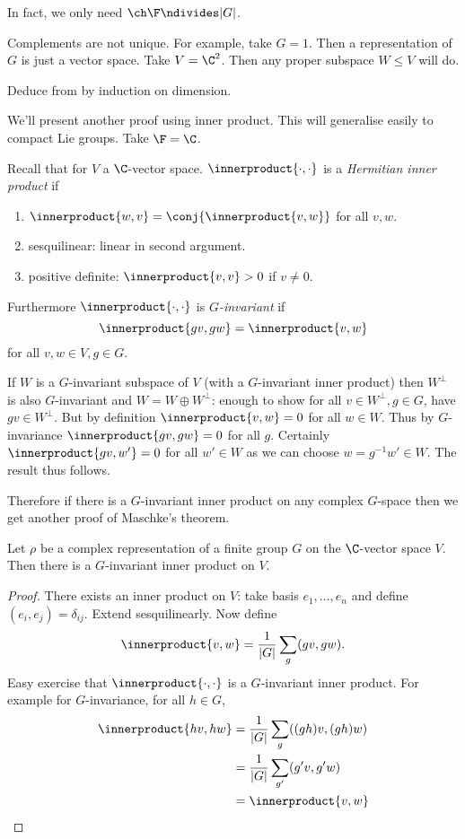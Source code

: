 \documentclass[a4paper]{article}
\newcommand*{\ip}{\innerproduct} %
\theoremstyle{definition}
\begin{document}
In fact, we only need \(\ch \F \ndivides |G|\).

\begin{remark}
  Complements are not unique. For example, take \(G = 1\). Then a representation of \(G\) is just a vector space. Take \(V = \C^2\). Then any proper subspace \(W \leq V\) will do.
\end{remark}

\begin{ex}
  Deduce  from  by induction on dimension.
\end{ex}

We'll present another proof using inner product. This will generalise easily to compact Lie groups. Take \(\F = \C\).

Recall that for \(V\) a \(\C\)-vector space. \(\ip{\cdot, \cdot}\) is a \emph{Hermitian inner product} if
\begin{enumerate}
\item \(\ip{w, v} = \conj{\ip{v, w}}\) for all \(v, w\).
\item sesquilinear: linear in second argument.
\item positive definite: \(\ip{v, v} > 0\) if \(v \neq 0\).
\end{enumerate}
Furthermore \(\ip{\cdot, \cdot}\) is \emph{\(G\)-invariant} if
\[
  \ip{gv, gw} = \ip{v, w}
\]
for all \(v, w \in V, g \in G\).

If \(W\) is a \(G\)-invariant subspace of \(V\) (with a \(G\)-invariant inner product) then \(W^\perp\) is also \(G\)-invariant and \(W = W \oplus W^\perp\): enough to show for all \(v \in W^\perp, g \in G\), have \(gv \in W^\perp\). But by definition \(\ip{v, w} = 0\) for all \(w \in W\). Thus by \(G\)-invariance \(\ip{gv, gw} = 0\) for all \(g\). Certainly \(\ip{gv, w'} = 0\) for all \(w' \in W\) as we can choose \(w = g^{-1}w' \in W\). The result thus follows.

Therefore if there is a \(G\)-invariant inner product on any complex \(G\)-space then we get another proof of Maschke's theorem.

\begin{lemma}
  Let \(\rho\) be a complex representation of a finite group \(G\) on the \(\C\)-vector space \(V\). Then there is a \(G\)-invariant inner product on \(V\).
\end{lemma}

\begin{proof}
  There exists an inner product on \(V\): take basis \(e_1, \dots, e_n\) and define \((e_i, e_j) = \delta_{ij}\). Extend sesquilinearly. Now define
  \[
    \ip{v, w} = \frac{1}{|G|} \sum_g (gv, gw).
  \]
  Easy exercise that \(\ip{\cdot, \cdot}\) is a \(G\)-invariant inner product. For example for \(G\)-invariance, for all \(h \in G\),
  \begin{align*}
    \ip{hv, hw}
    &= \frac{1}{|G|} \sum_g ((gh)v, (gh)w) \\
    &= \frac{1}{|G|} \sum_{g'} (g'v, g'w) \\
    &= \ip{v, w}
  \end{align*}
\end{proof}
\end{document}
